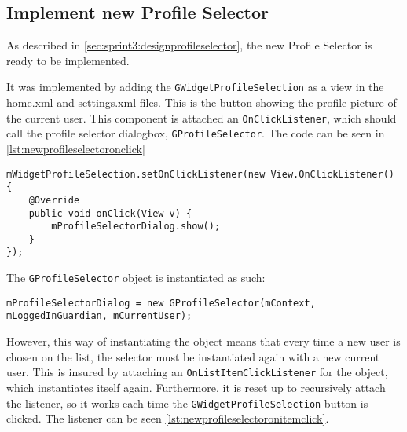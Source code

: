 \subsection{Implement new Profile Selector}\label{sec:sprint3:devprofileselector}

As described in \cref{sec:sprint3:designprofileselector}, the new Profile Selector is ready to be implemented.

It was implemented by adding the \lstinline!GWidgetProfileSelection! as a view in the home.xml and settings.xml files.
This is the button showing the profile picture of the current user.
This component is attached an \lstinline!OnClickListener!, which should call the profile selector dialogbox, \lstinline!GProfileSelector!.
The code can be seen in \cref{lst:newprofileselectoronclick}

\begin{lstlisting}[caption={The OnClickListener for the Profile Selector button.}, label={lst:newprofileselectoronclick}]
mWidgetProfileSelection.setOnClickListener(new View.OnClickListener() {
	@Override
	public void onClick(View v) {
		mProfileSelectorDialog.show();
	}
});
\end{lstlisting}

The \lstinline!GProfileSelector! object is instantiated as such:\\

\begin{center}
\lstinline!mProfileSelectorDialog = new GProfileSelector(mContext, mLoggedInGuardian, mCurrentUser);!
\end{center}

However, this way of instantiating the object means that every time a new user is chosen on the list, the selector must be instantiated again with a new current user.
This is insured by attaching an \lstinline!OnListItemClickListener! for the object, which instantiates itself again.
Furthermore, it is reset up to recursively attach the listener, so it works each time the \lstinline!GWidgetProfileSelection! button is clicked.
The listener can be seen \cref{lst:newprofileselectoronitemclick}.


